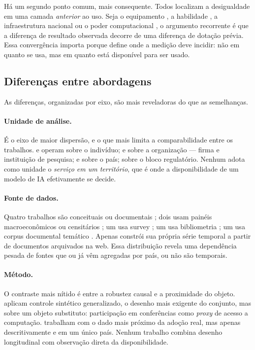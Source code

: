 \documentclass[12pt,a4paper]{article}
\begin{document}
Há um segundo ponto comum, mais consequente. Todos localizam a desigualdade em uma
camada \emph{anterior} ao uso. Seja o equipamento \cite{vandeursen2018}, a habilidade
\cite{wang2024}, a infraestrutura nacional \cite{mannuru2023,furtado2024} ou o poder
computacional \cite{ahmed2020,sastry2024}, o argumento recorrente é que a diferença de
resultado observada decorre de uma diferença de dotação prévia. Essa convergência
importa porque define onde a medição deve incidir: não em quanto se usa, mas em quanto
está disponível para ser usado.

\subsection{Diferenças entre abordagens}

As diferenças, organizadas por eixo, são mais reveladoras do que as semelhanças.

\paragraph{Unidade de análise.} É o eixo de maior dispersão, e o que mais limita a
comparabilidade entre os trabalhos. \textcite{wang2024} e \textcite{lutz2019} operam
sobre o indivíduo; \textcite{mcelheran2024} e \textcite{ahmed2020} sobre a organização
--- firma e instituição de pesquisa; \textcite{knez2023} e \textcite{mannuru2023}
sobre o país; \textcite{mugge2024} sobre o bloco regulatório. Nenhum adota como unidade
o \emph{serviço em um território}, que é onde a disponibilidade de um modelo de IA
efetivamente se decide.

\begin{sloppypar}
\paragraph{Fonte de dados.} Quatro trabalhos são conceituais ou documentais
\cite{lutz2019,mannuru2023,sastry2024,mugge2024}; dois usam painéis macroeconômicos ou
censitários \cite{knez2023,mcelheran2024}; um usa survey \cite{wang2024}; um usa
bibliometria \cite{ahmed2020}; um usa corpus documental temático \cite{furtado2024}.
Apenas \textcite{amos2021} constrói sua própria série temporal a partir de documentos
arquivados na web. Essa distribuição revela uma dependência pesada de fontes que ou já
vêm agregadas por país, ou não são temporais.
\end{sloppypar}

\paragraph{Método.} O contraste mais nítido é entre a robustez causal e a proximidade
do objeto. \textcite{ahmed2020} aplicam controle sintético generalizado, o desenho
mais exigente do conjunto, mas sobre um objeto substituto: participação em
conferências como \emph{proxy} de acesso a computação. \textcite{mcelheran2024}
trabalham com o dado mais próximo da adoção real, mas apenas descritivamente e em um
único país. Nenhum trabalho combina desenho longitudinal com observação direta da
disponibilidade.
\end{document}
